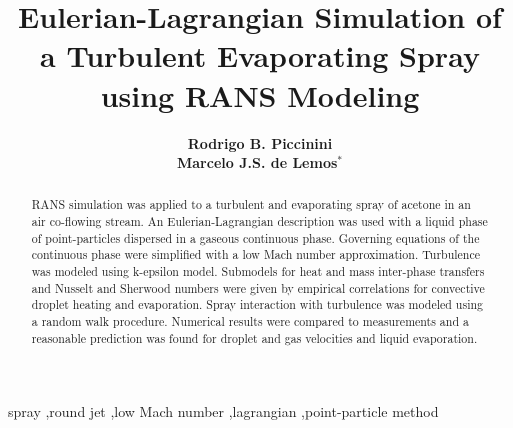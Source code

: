 \documentclass[preprint,12pt,review]{elsarticle}
\begin{document}
\begin{frontmatter}



\title{Eulerian-Lagrangian Simulation of a Turbulent Evaporating Spray using RANS Modeling}


\author[]{\textbf{Rodrigo B. Piccinini}\\ \textbf{Marcelo J.S. de Lemos}$^{*}$}
\address{Departamento de Energia - IEME \\
Instituto Tecnol\'{o}gico de Aeron\'{a}utica - ITA\\
12228-900 - S\~{a}o Jos\'{e} dos Campos - SP, Brazil\\
$^{*}$\textit{\textbf{Corresponding author} E-mail: \underline{delemos@ita.br}}}


\begin{abstract}
RANS simulation was applied to a turbulent and evaporating spray of acetone in an air co-flowing stream. An Eulerian-Lagrangian description was used with a liquid phase of point-particles dispersed in a gaseous continuous phase. Governing equations of the continuous phase were simplified with a low Mach number approximation. Turbulence was modeled using k-epsilon model. Submodels for heat and mass inter-phase transfers and Nusselt and Sherwood numbers were given by empirical correlations for convective droplet heating and evaporation. Spray interaction with turbulence was modeled using a random walk procedure. Numerical results were compared to measurements and a reasonable prediction was found for droplet and gas velocities and liquid evaporation.
\end{abstract}

\begin{keyword}

spray \sep round jet \sep low Mach number \sep lagrangian \sep point-particle method
\end{keyword}

\end{frontmatter}
\end{document}
